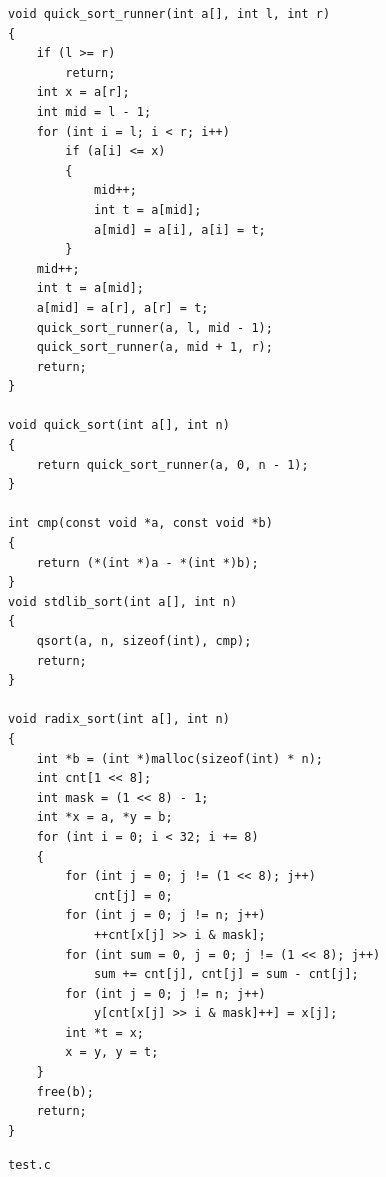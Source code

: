 \documentclass[12pt]{article}
\begin{document}
{\begin{lstlisting}
void quick_sort_runner(int a[], int l, int r)
{
    if (l >= r)
        return;
    int x = a[r];
    int mid = l - 1;
    for (int i = l; i < r; i++)
        if (a[i] <= x)
        {
            mid++;
            int t = a[mid];
            a[mid] = a[i], a[i] = t;
        }
    mid++;
    int t = a[mid];
    a[mid] = a[r], a[r] = t;
    quick_sort_runner(a, l, mid - 1);
    quick_sort_runner(a, mid + 1, r);
    return;
}

void quick_sort(int a[], int n)
{
    return quick_sort_runner(a, 0, n - 1);
}

int cmp(const void *a, const void *b)
{
    return (*(int *)a - *(int *)b);
}
void stdlib_sort(int a[], int n)
{
    qsort(a, n, sizeof(int), cmp);
    return;
}

void radix_sort(int a[], int n)
{
    int *b = (int *)malloc(sizeof(int) * n);
    int cnt[1 << 8];
    int mask = (1 << 8) - 1;
    int *x = a, *y = b;
    for (int i = 0; i < 32; i += 8)
    {
        for (int j = 0; j != (1 << 8); j++)
            cnt[j] = 0;
        for (int j = 0; j != n; j++)
            ++cnt[x[j] >> i & mask];
        for (int sum = 0, j = 0; j != (1 << 8); j++)
            sum += cnt[j], cnt[j] = sum - cnt[j];
        for (int j = 0; j != n; j++)
            y[cnt[x[j] >> i & mask]++] = x[j];
        int *t = x;
        x = y, y = t;
    }
    free(b);
    return;
}
\end{lstlisting}
}

\texttt{test.c}
\end{document}
